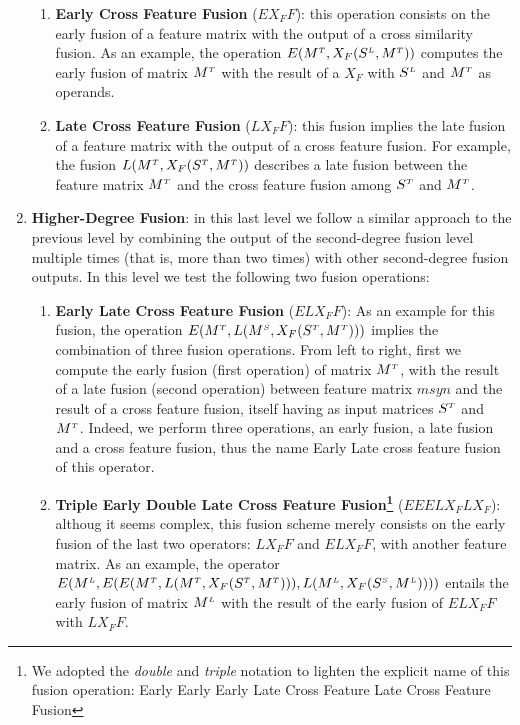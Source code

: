 \begin{enumerate}
\begin{enumerate}
%
\item \textbf{Early Cross Feature Fusion} ($EX_FF$):  this operation consists on the early fusion of a feature matrix with the output of a cross similarity fusion. As an example, the operation $E(M^{\scriptscriptstyle T},X_F(S^{\scriptscriptstyle L}, M^{\scriptscriptstyle T}))$ computes the early fusion of matrix $M^{\scriptscriptstyle T}$ with the result of a $X_F$ with $S^{\scriptscriptstyle L}$ and $M^{\scriptscriptstyle T}$ as operands. 
%

\item \textbf{Late Cross Feature Fusion} ($LX_FF$): this fusion implies the late fusion of a feature matrix with the output of a cross feature fusion. For example, the fusion $L(M^{\scriptscriptstyle T}, X_F(S^{\scriptscriptstyle T}, M^{\scriptscriptstyle T}))$ describes a late fusion between the feature matrix $M^{\scriptscriptstyle T}$ and the cross feature fusion among $S^{\scriptscriptstyle T}$ and $M^{\scriptscriptstyle T}$.
\end{enumerate}

\item \textbf{Higher-Degree Fusion}: in this last level we follow a similar approach to the previous level by combining the output of the second-degree fusion level multiple times (that is, more than two times) with other second-degree fusion outputs. In this level we test the following two fusion operations:
\begin{enumerate}
\item \textbf{Early Late Cross Feature Fusion} ($ELX_FF$): As an example for this fusion, the operation $E(M^{\scriptscriptstyle T}, \allowbreak L(M^{\scriptscriptstyle S}, X_F(S^{\scriptscriptstyle T}, M^{\scriptscriptstyle T})))$ implies the combination of three fusion operations. From left to right, first we compute the early fusion (first operation) of  matrix $M^{\scriptscriptstyle T}$, with the result of a late fusion (second operation) between feature matrix $msyn$ and the result of a cross feature fusion, itself having as input matrices $S^{\scriptscriptstyle T}$ and $M^{\scriptscriptstyle T}$. Indeed, we perform three operations, an early fusion, a late fusion and a cross feature fusion, thus the name Early Late cross feature fusion of this operator.
\item \textbf{Triple Early Double Late Cross Feature Fusion\footnote{We adopted the \textit{double} and \textit{triple} notation to lighten the explicit name of this fusion operation: Early Early Early Late Cross Feature Late Cross Feature Fusion}}
 ($EEELX_FLX_F$): althoug it seems complex, this fusion scheme merely consists on the early fusion of the last two operators: $LX_FF$ and $ELX_FF$, with another feature matrix. As an example, the operator  $E(M^{\scriptscriptstyle L}, E(E(M^{\scriptscriptstyle T},  L(M^{\scriptscriptstyle T}, X_F(S^{\scriptscriptstyle T}, M^{\scriptscriptstyle T}))),\allowbreak L(M^{\scriptscriptstyle L}, X_F(S^{\scriptscriptstyle S}, M^{\scriptscriptstyle L}))))$ entails the early fusion of matrix $M^{\scriptscriptstyle L}$ with the result of the early fusion of $ELX_FF$ with $LX_FF$.
\end{enumerate}


\end{enumerate}
